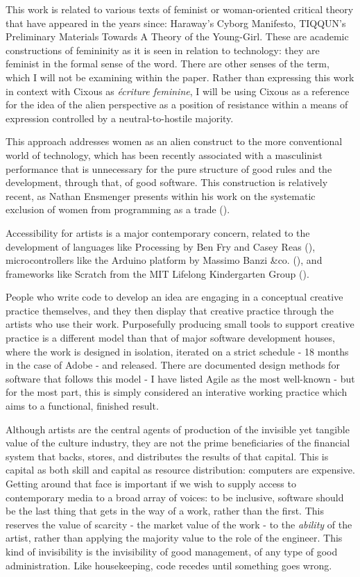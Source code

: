 This work is related to various texts of feminist or woman-oriented critical theory that have appeared in the years since: Haraway’s Cyborg Manifesto, TIQQUN’s Preliminary Materials Towards A Theory of the Young-Girl. These are academic constructions of femininity as it is seen in relation to technology: they are feminist in the formal sense of the word. There are other senses of the term, which I will not be examining within the paper. Rather than expressing this work in context with Cixous as \textit{écriture feminine}, I will be using Cixous as a reference for the idea of the alien perspective as a position of resistance within a means of expression controlled by a neutral-to-hostile majority. 

This approach addresses women as an alien construct to the more conventional world of technology, which has been recently associated with a masculinist performance that is unnecessary for the pure structure of good rules and the development, through that, of good software. This construction is relatively recent, as Nathan Ensmenger presents within his work on the systematic exclusion of women from programming as a trade (\cite{ensmenger}).

Accessibility for artists is a major contemporary concern, related to the development of languages like Processing by Ben Fry and Casey Reas (\cite{processing}), microcontrollers like the Arduino platform by Massimo Banzi &co. (\cite{arduino}), and frameworks like Scratch from the MIT Lifelong Kindergarten Group (\cite{scratch}). 

People who write code to develop an idea are engaging in a conceptual creative practice themselves, and they then display that creative practice through the artists who use their work. Purposefully producing small tools to support creative practice is a different model than that of major software development houses, where the work is designed in isolation, iterated on a strict schedule - 18 months in the case of Adobe \cite{adobe} - and released. There are documented design methods for software that follows this model - I have listed Agile as the most well-known - but for the most part, this is simply considered an interative working practice which aims to a functional, finished result.

Although artists are the central agents of production of the invisible yet tangible value of the culture industry, they are not the prime beneficiaries of the financial system that backs, stores, and distributes the results of that capital. This is capital as both skill and capital as resource distribution: computers are expensive. Getting around that face is important if we wish to supply access to contemporary media to a broad array of voices: to be inclusive, software should be the last thing that gets in the way of a work, rather than the first. This reserves the value of scarcity - the market value of the work - to the \textit{ability} of the artist, rather than applying the majority value to the role of the engineer. This kind of invisibility is the invisibility of good management, of any type of good administration. Like housekeeping, code recedes until something goes wrong.

